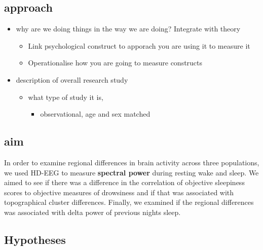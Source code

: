 \documentclass[
]{article}
\providecommand{\tightlist}{%
  \setlength{\itemsep}{0pt}\setlength{\parskip}{0pt}}
\begin{document}
\subsection{approach}\label{approach}

\begin{itemize}
\tightlist
\item
  why are we doing things in the way we are doing? Integrate with theory

  \begin{itemize}
  \tightlist
  \item
    Link psychological construct to apporach you are using it to measure
    it
  \item
    Operationalise how you are going to measure constructs
  \end{itemize}
\item
  description of overall research study

  \begin{itemize}
  \tightlist
  \item
    what type of study it is,

    \begin{itemize}
    \tightlist
    \item
      observational, age and sex matched
    \end{itemize}
  \end{itemize}
\end{itemize}

\subsection{aim}\label{aim}

In order to examine regional differences in brain activity across three
populations, we used HD-EEG to measure \textbf{spectral power} during
resting wake and sleep. We aimed to see if there was a difference in the
correlation of objective sleepiness scores to objective measures of
drowsiness and if that was associated with topographical cluster
differences. Finally, we examined if the regional differences was
associated with delta power of previous nights sleep.

\subsection{Hypotheses}\label{hypotheses}
\end{document}
